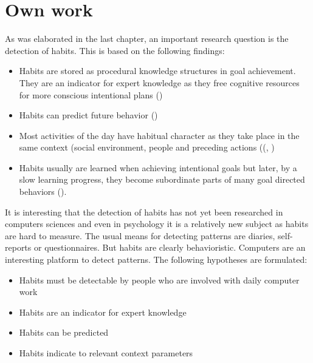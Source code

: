 
\chapter{Own work}
\label{ownwork} 
As was elaborated in the last chapter, an important research question is the detection of habits. This is based on the following findings:
\begin{itemize}
  \item Habits are stored as procedural knowledge structures in goal achievement. They are an indicator for expert knowledge as they free cognitive resources for more conscious intentional plans (\cite{aarts2000habits})
  \item Habits can predict future behavior (\cite{bentler1979models})
  \item Most activities of the day have habitual character  as they take place in the same context (social environment, people and preceding actions ((\cite{townsend2001sentence}, \cite{wood2007new})
  \item Habits usually are learned when achieving intentional goals but later, by a slow learning progress, they become subordinate parts of many goal directed behaviors (\cite{wood2007new}). 
\end{itemize}

It is interesting that the detection of habits has not yet been researched in computers sciences and even in psychology it is a relatively new subject as habits are hard to measure. The usual means for detecting patterns are diaries, self-reports or questionnaires. But habits are clearly behavioristic. Computers are an interesting platform to detect patterns. The following hypotheses are formulated:

\begin{itemize}
  \item Habits must be detectable by people who are involved with daily computer work
  \item Habits are an indicator for expert knowledge
  \item Habits can be predicted
  \item Habits indicate to relevant context parameters
\end{itemize}

